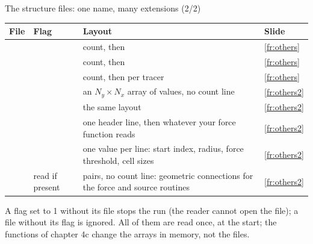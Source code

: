 \documentclass[aspectratio=169,11pt]{beamer}
\begin{document}
\begin{frame}{The structure files: one name, many extensions (2/2)}
\label{fr:family2}
\scriptsize
\begin{tabular}{@{}L{0.14\textwidth}L{0.16\textwidth}L{0.46\textwidth}L{0.14\textwidth}@{}}
\toprule
File & Flag & Layout & Slide \\
\midrule
{} &  & count, then  & \ref{fr:others} \\
 &  & count, then  & \ref{fr:others} \\
 &  & count, then  per tracer & \ref{fr:others} \\
 &  & an $N_y \times N_x$ array of values, no count line & \ref{fr:others2} \\
 &  & the same layout & \ref{fr:others2} \\
 &  & one header line, then whatever your force function reads & \ref{fr:others2} \\
 &  & one value per line: start index, radius, force threshold, cell sizes & \ref{fr:others2} \\
 & read if present &  pairs, no count line: geometric connections for the force and source routines & \ref{fr:others2} \\
\bottomrule
\end{tabular}

\vspace{1mm}
\small A flag set to 1 without its file stops the run (the reader cannot open the file); a file without its flag is ignored. All of them are read once, at the start; the  functions of chapter 4c change the arrays in memory, not the files.
\end{frame}
\end{document}
